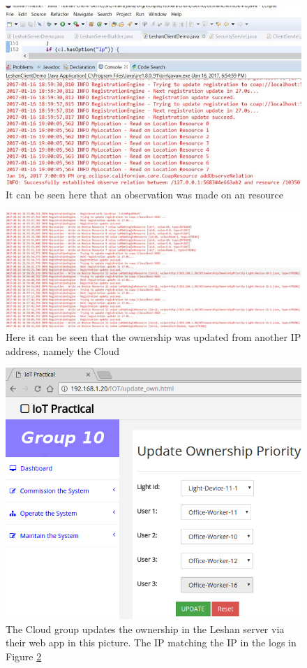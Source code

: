 \documentclass[11pt]{article}
\begin{document}
\begin{figure}[h]
	\begin{center}
		\includegraphics[width=\linewidth]{img/screenshot-observe}
		\caption{It can be seen here that an observation was made on an resource}
		\label{fig:observe}
	\end{center}
\end{figure}

\begin{figure}[h!]
	\begin{center}
		\includegraphics[width=1.18\linewidth]{img/screenshot-ownership}
		\caption{Here it can be seen that the ownership was updated from another IP address, namely the Cloud}
		\label{fig:own}
	\end{center}
\end{figure}

\begin{figure}[h!]
	\begin{center}
		\includegraphics[width=.6\linewidth]{img/screenshot-cloud-ownership}
		\caption{The Cloud group updates the ownership in the Leshan server via their web app in this picture. The IP matching the IP in the logs in Figure \ref{fig:own}}
		\label{fig:cloudown}
	\end{center}
\end{figure}
\end{document}
